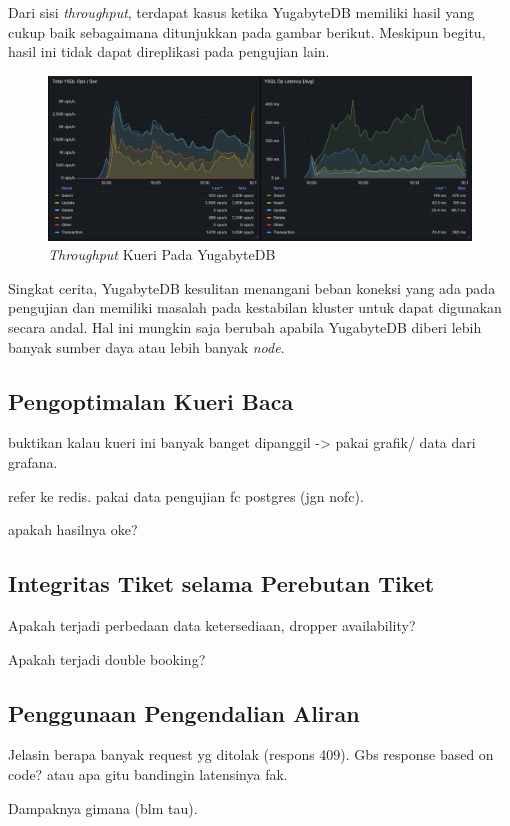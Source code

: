 Dari sisi \textit{throughput}, terdapat kasus ketika YugabyteDB memiliki hasil yang cukup baik sebagaimana ditunjukkan pada gambar berikut. Meskipun begitu, hasil ini tidak dapat direplikasi pada pengujian lain.

\begin{figure}[htbp]
    \centering
    \includegraphics[width=1\textwidth]{resources/chapter-4/yugabyte-ops.png}
    \caption{\textit{Throughput} Kueri Pada YugabyteDB}
    \label{fig:yugabytedb-throughput}
\end{figure}

Singkat cerita, YugabyteDB kesulitan menangani beban koneksi yang ada pada pengujian dan memiliki masalah pada kestabilan kluster untuk dapat digunakan secara andal. Hal ini mungkin saja berubah apabila YugabyteDB diberi lebih banyak sumber daya atau lebih banyak \textit{node}.

\subsection{Pengoptimalan Kueri Baca}

buktikan kalau kueri ini banyak banget dipanggil -> pakai grafik/ data dari grafana.

refer ke redis. pakai data pengujian fc postgres (jgn nofc).

apakah hasilnya oke?

\subsection{Integritas Tiket selama Perebutan Tiket}

Apakah terjadi perbedaan data ketersediaan, dropper availability?

Apakah terjadi double booking?

\subsection{Penggunaan Pengendalian Aliran}

Jelasin berapa banyak request yg ditolak (respons 409). Gbs response based on code? atau apa gitu bandingin latensinya fak.

Dampaknya gimana (blm tau).

